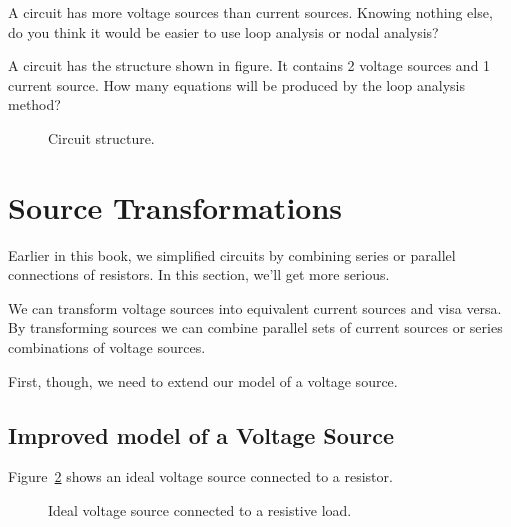 \begin{clevel}
A circuit has more voltage sources than current sources. Knowing nothing else, do you think it would be easier to use loop analysis or nodal analysis? 
\end{clevel}


\begin{clevel}
A circuit has the structure shown in figure. It contains 2 voltage sources and 1 current source. How many equations will be produced by the loop analysis method? 

\begin{figure}[H]
\begin{center}
\caption{Circuit structure.}
\label{F:4RECT2}
\end{center}
\end{figure}

\end{clevel}
\section{Source Transformations}
Earlier in this book, we simplified circuits by combining series or parallel connections of resistors. In this section, we'll get more serious.\par

We can transform voltage sources into equivalent current sources and visa versa. By transforming sources we can combine parallel sets of current sources or series combinations of voltage sources.\par
First, though, we need to extend our model of a voltage source.

\subsection{Improved model of a Voltage Source}
Figure~\ref{F:4RVA} shows an ideal voltage source connected to a resistor.

\begin{figure}[H]
\begin{center}
\caption{Ideal voltage source connected to a resistive load.}
\label{F:4RVA}
\end{center}
\end{figure}

